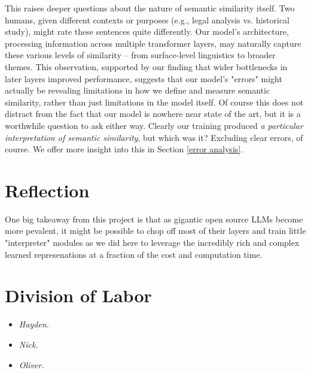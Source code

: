 \documentclass[14pt]{article}
\begin{document}
This raises deeper questions about the nature of semantic similarity itself. Two humans, given different contexts or purposes (e.g., legal analysis vs. historical study), might rate these sentences quite differently. Our model's architecture, processing information across multiple transformer layers, may naturally capture these various levels of similarity -- from surface-level linguistics to broader themes. This observation, supported by our finding that wider bottlenecks in later layers improved performance, suggests that our model's "errors" might actually be revealing limitations in how we define and measure semantic similarity, rather than just limitations in the model itself. Of course this does not distract from the fact that our model is nowhere near state of the art, but it is a worthwhile question to ask either way. Clearly our training produced \textit{a particular interpretation of semantic similarity}, but which was it? Excluding clear errors, of course. We offer more insight into this in Section \ref{error analysis}.

\section{Reflection}

One big takeaway from this project is that as gigantic open source LLMs become more pevalent, it might be possible to chop off most of their layers and train little "interpreter" modules as we did here to leverage the incredibly rich and complex learned represenations at a fraction of the cost and computation time.

\section{Division of Labor}
\begin{itemize}
    \item \textit{Hayden.}
    \item \textit{Nick.} 
    \item \textit{Oliver.} 
\end{itemize}
\end{document}
